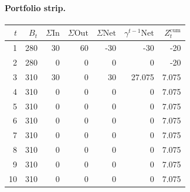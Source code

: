 \documentclass[12pt, a4paper]{article}
\begin{document}
\paragraph{Portfolio strip.}
\begin{center}
\begin{tabular}{rrrrrrr}
\toprule
$t$ & $B_t$ & $\Sigma\mathrm{In}$ & $\Sigma\mathrm{Out}$ & $\Sigma\mathrm{Net}$ & $\gamma^{t-1}\mathrm{Net}$ & $Z_t^{\mathrm{cum}}$\\
\midrule
1 & 280 & 30 & 60 & -30 & -30 & -20 \\
2 & 280 & 0 & 0 & 0 & 0 & -20 \\
3 & 310 & 30 & 0 & 30 & 27.075 & 7.075 \\
4 & 310 & 0 & 0 & 0 & 0 & 7.075 \\
5 & 310 & 0 & 0 & 0 & 0 & 7.075 \\
6 & 310 & 0 & 0 & 0 & 0 & 7.075 \\
7 & 310 & 0 & 0 & 0 & 0 & 7.075 \\
8 & 310 & 0 & 0 & 0 & 0 & 7.075 \\
9 & 310 & 0 & 0 & 0 & 0 & 7.075 \\
10 & 310 & 0 & 0 & 0 & 0 & 7.075 \\
\bottomrule
\end{tabular}
\end{center}
\end{document}
